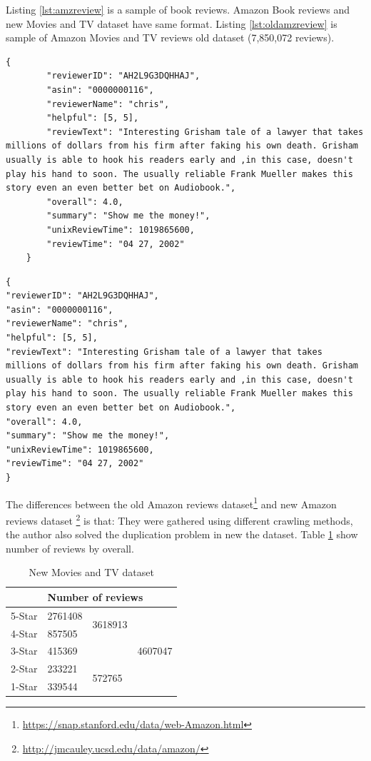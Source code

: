 Listing \ref{lst:amzreview} is a sample of book reviews. 
Amazon Book reviews and new Movies and TV dataset  have same format. Listing \ref{lst:oldamzreview} is sample of Amazon Movies and TV reviews old dataset (7,850,072 reviews). 

\begin{lstlisting}[caption={Amazon reviews sample},label={lst:amzreview}]
	{
		"reviewerID": "AH2L9G3DQHHAJ",
		"asin": "0000000116",
		"reviewerName": "chris",
		"helpful": [5, 5],
		"reviewText": "Interesting Grisham tale of a lawyer that takes millions of dollars from his firm after faking his own death. Grisham usually is able to hook his readers early and ,in this case, doesn't play his hand to soon. The usually reliable Frank Mueller makes this story even an even better bet on Audiobook.",
		"overall": 4.0,
		"summary": "Show me the money!",
		"unixReviewTime": 1019865600,
		"reviewTime": "04 27, 2002"
	}
\end{lstlisting}

\begin{lstlisting}[caption={Old Amazon reviews sample},label={lst:oldamzreview}]
{
"reviewerID": "AH2L9G3DQHHAJ",
"asin": "0000000116",
"reviewerName": "chris",
"helpful": [5, 5],
"reviewText": "Interesting Grisham tale of a lawyer that takes millions of dollars from his firm after faking his own death. Grisham usually is able to hook his readers early and ,in this case, doesn't play his hand to soon. The usually reliable Frank Mueller makes this story even an even better bet on Audiobook.",
"overall": 4.0,
"summary": "Show me the money!",
"unixReviewTime": 1019865600,
"reviewTime": "04 27, 2002"
}
\end{lstlisting}

The differences between the old Amazon reviews dataset\footnote{\url{https://snap.stanford.edu/data/web-Amazon.html}} and new Amazon reviews dataset \footnote{\url{http://jmcauley.ucsd.edu/data/amazon/}} is that: 
They were gathered using different crawling methods, the author also solved the duplication problem in new the dataset\cite{amazon-reviews}.
Table \ref{table:moviereview} show number of reviews by overall.

\begin{table}[H]
	\centering
	\caption{New Movies and TV dataset}
	\label{table:moviereview}
	\begin{tabular}{@{}lllc@{}}
		\toprule
		& \multicolumn{3}{l}{Number of reviews}                         \\ \midrule
		5-Star & 2761408 & \multirow{2}{*}{3618913} & \multirow{5}{*}{4607047} \\ \cmidrule(r){1-2}
		4-Star & 857505  &                          &                          \\ \cmidrule(r){1-3}
		3-Star & \multicolumn{2}{l}{415369}         &                          \\ \cmidrule(r){1-3}
		2-Star & 233221  & \multirow{2}{*}{572765}  &                          \\ \cmidrule(r){1-2}
		1-Star & 339544  &                          &                          \\ \bottomrule
	\end{tabular}
\end{table}


